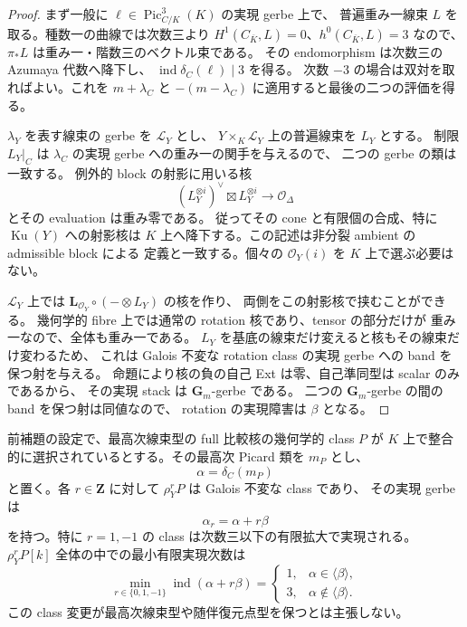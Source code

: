 \begin{proof}
まず一般に $\ell\in\operatorname{Pic}^3_{C/K}(K)$ の実現 gerbe 上で、
普遍重み一線束 $L$ を取る。種数一の曲線では次数三より
$H^1(C_{\overline K},L)=0$、$h^0(C_{\overline K},L)=3$ なので、
$\pi_*L$ は重み一・階数三のベクトル束である。
その endomorphism は次数三の Azumaya 代数へ降下し、
$\operatorname{ind}\delta_C(\ell)\mid3$ を得る。
次数 $-3$ の場合は双対を取ればよい。これを $m+\lambda_C$ と
$-(m-\lambda_C)$ に適用すると最後の二つの評価を得る。

$\lambda_Y$ を表す線束の gerbe を $\mathscr L_Y$ とし、
$Y\times_K\mathscr L_Y$ 上の普遍線束を $L_Y$ とする。
制限 $L_Y|_C$ は $\lambda_C$ の実現 gerbe への重み一の関手を与えるので、
二つの gerbe の類は一致する。
例外的 block の射影に用いる核
\[
 (L_Y^{\otimes i})^\vee\boxtimes L_Y^{\otimes i}
 \longrightarrow\mathcal O_\Delta
\]
とその evaluation は重み零である。
従ってその cone と有限個の合成、特に $\operatorname{Ku}(Y)$ への射影核は
$K$ 上へ降下する。この記述は非分裂 ambient の admissible block による
定義と一致する。個々の $\mathcal O_Y(i)$ を $K$ 上で選ぶ必要はない。

$\mathscr L_Y$ 上では
$\mathbf L_{\mathcal O_Y}\circ(-\otimes L_Y)$ の核を作り、
両側をこの射影核で挟むことができる。
幾何学的 fibre 上では通常の rotation 核であり、tensor の部分だけが
重み一なので、全体も重み一である。
$L_Y$ を基底の線束だけ変えると核もその線束だけ変わるため、
これは Galois 不変な rotation class の実現 gerbe への band を保つ射を与える。
命題により核の負の自己 Ext は零、自己準同型は scalar のみであるから、
その実現 stack は $\mathbf G_m$-gerbe である。
二つの $\mathbf G_m$-gerbe の間の band を保つ射は同値なので、
rotation の実現障害は $\beta$ となる。
\end{proof}

\begin{theorem}
\label{thm:nfm-unsplit-rotation-index-three}
前補題の設定で、最高次線束型の full 比較核の幾何学的 class $P$ が
$K$ 上で整合的に選択されているとする。その最高次 Picard 類を $m_P$ とし、
\[
 \alpha=\delta_C(m_P)
\]
と置く。各 $r\in\mathbf Z$ に対して $\rho_Y^rP$ は Galois 不変な class であり、
その実現 gerbe は
\begin{equation}\label{eq:nfm-unsplit-rotation-brauer-orbit}
 \alpha_r=\alpha+r\beta
\end{equation}
を持つ。特に $r=1,-1$ の class は次数三以下の有限拡大で実現される。
$\rho_Y^rP[k]$ 全体の中での最小有限実現次数は
\[
 \min_{r\in\{0,1,-1\}}\operatorname{ind}(\alpha+r\beta)
 =\begin{cases}
  1,&\alpha\in\langle\beta\rangle,\\
  3,&\alpha\notin\langle\beta\rangle.
 \end{cases}
\]
この class 変更が最高次線束型や随伴復元点型を保つとは主張しない。
\end{theorem}

